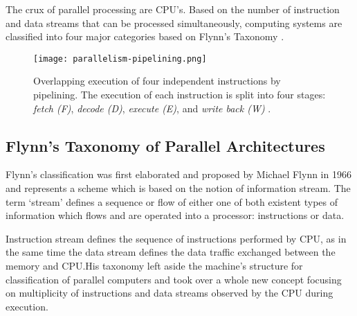 The crux of parallel processing are CPU's. Based on the number of instruction and data streams that can be processed simultaneously, computing systems are classified into four major categories based on Flynn’s Taxonomy \parencite{internet7}.

\begin{figure}[h!]
	\centering
	\texttt{[image: parallelism-pipelining.png]}
	\caption{
		Overlapping execution of four independent instructions by pipelining. The execution of each instruction is split into four stages: \textit{fetch (F)}, \textit{decode (D)}, \textit{execute (E)}, and \textit{write back (W)} \parencite[see][Fig. 2.1, p11]{book1}.
	}
	\label{fig:parallelismPipe}
\end{figure}

\subsection{Flynn's Taxonomy of Parallel Architectures}

Flynn’s classification was first elaborated and proposed by Michael Flynn in 1966 and represents a scheme which is based on the notion of information stream. The term ‘stream’ defines a sequence or flow of either one of both existent types of information which flows and are operated into a processor: instructions or data. 

Instruction stream defines the sequence of instructions performed by CPU, as in the same time the data stream defines the data traffic exchanged between the memory and CPU.His taxonomy left aside the machine’s structure for classification of parallel computers and took over a whole new concept focusing on multiplicity of instructions and data streams observed by the CPU during execution.

\newpage

